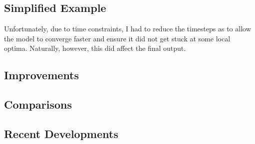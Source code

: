 \documentclass[conference]{IEEEtran}
\begin{document}
\subsection{Simplified Example}

Unfortunately, due to time constraints, I had to reduce the timesteps as to allow the model to converge faster and ensure it did not get stuck at some local optima. Naturally, however, this did affect the final output.

\subsection{Improvements}

\subsection{Comparisons}

\subsection{Recent Developments}



\end{document}
